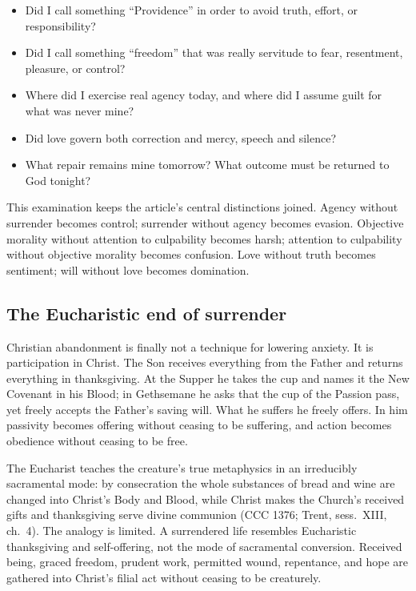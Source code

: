 \begin{itemize}
\item Did I call something ``Providence'' in order to avoid truth, effort, or responsibility?
\item Did I call something ``freedom'' that was really servitude to fear, resentment, pleasure, or control?
\item Where did I exercise real agency today, and where did I assume guilt for what was never mine?
\item Did love govern both correction and mercy, speech and silence?
\item What repair remains mine tomorrow? What outcome must be returned to God tonight?
\end{itemize}

This examination keeps the article's central distinctions joined. Agency without surrender becomes control; surrender without agency becomes evasion. Objective morality without attention to culpability becomes harsh; attention to culpability without objective morality becomes confusion. Love without truth becomes sentiment; will without love becomes domination.

\subsection{The Eucharistic end of surrender}

Christian abandonment is finally not a technique for lowering anxiety. It is
participation in Christ. The Son receives everything from the Father and
returns everything in thanksgiving. At the Supper he takes the cup and names it
the New Covenant in his Blood; in Gethsemane he asks that the cup of the
Passion pass, yet freely accepts the Father's saving will. What he suffers he
freely offers. In him passivity becomes offering without ceasing to be
suffering, and action becomes obedience without ceasing to be free.

The Eucharist teaches the creature's true metaphysics in an irreducibly sacramental mode: by consecration the whole substances of bread and wine are changed into Christ's Body and Blood, while Christ makes the Church's received gifts and thanksgiving serve divine communion (CCC 1376; Trent, sess.~XIII, ch.~4). The analogy is limited. A surrendered life resembles Eucharistic thanksgiving and self-offering, not the mode of sacramental conversion. Received being, graced freedom, prudent work, permitted wound, repentance, and hope are gathered into Christ's filial act without ceasing to be creaturely.

